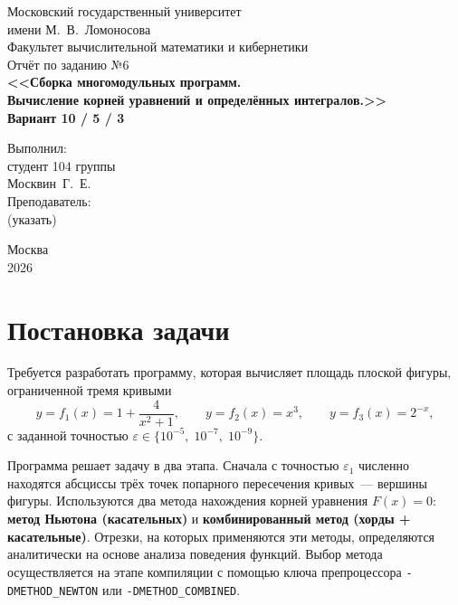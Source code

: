 \documentclass[a4paper,12pt,titlepage,finall]{article}
\begin{document}
\begin{titlepage}
    \begin{center}
        {\small \sc Московский государственный университет \\имени М.~В.~Ломоносова\\
        Факультет вычислительной математики и кибернетики\\}
        \vfill
        {\Large \sc Отчёт по заданию №6}\\[4mm]
        {\large \bf <<Сборка многомодульных программ.\\
        Вычисление корней уравнений и определённых интегралов.>>}\\[4mm]
        {\large \bf Вариант 10 / 5 / 3}
    \end{center}
    \begin{flushright}
        \vfill
        {Выполнил:\\
        студент 104 группы\\
        Москвин~Г.~Е.\\[4mm]
        Преподаватель:\\
        (указать)}
    \end{flushright}
    \begin{center}
        \vfill
        {\small Москва\\2026}
    \end{center}
\end{titlepage}

\tableofcontents
\newpage

\section{Постановка задачи}

Требуется разработать программу, которая вычисляет площадь плоской фигуры,
ограниченной тремя кривыми
\[
    y = f_1(x) = 1 + \frac{4}{x^2+1},\qquad
    y = f_2(x) = x^3,\qquad
    y = f_3(x) = 2^{-x},
\]
с заданной точностью $\varepsilon \in \{10^{-5},\;10^{-7},\;10^{-9}\}$.

Программа решает задачу в два этапа.
Сначала с точностью $\varepsilon_1$ численно находятся абсциссы трёх
точек попарного пересечения кривых~--- вершины фигуры.
Используются два метода нахождения корней уравнения $F(x)=0$:
\textbf{метод Ньютона (касательных)} и
\textbf{комбинированный метод (хорды + касательные)}.
Отрезки, на которых применяются эти методы, определяются
аналитически на основе анализа поведения функций.
Выбор метода осуществляется на этапе компиляции с помощью ключа
препроцессора \texttt{-DMETHOD\_NEWTON} или \texttt{-DMETHOD\_COMBINED}.
\end{document}
